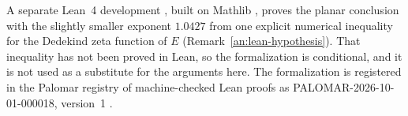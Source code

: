 A separate Lean~4 development \cite{NaslundLean2026}, built on Mathlib
\cite{Lean4_2021,Mathlib2020}, proves the planar conclusion with the
slightly smaller exponent $1.0427$ from one explicit numerical inequality
for the Dedekind zeta function of $E$
(Remark~\ref{an:lean-hypothesis}). That inequality has not been proved in
Lean, so the formalization is conditional, and it is not used as a
substitute for the arguments here. The formalization is registered in the
Palomar registry of machine-checked Lean proofs as
PALOMAR-2026-10-01-000018, version~1 \cite{NaslundLean2026}.
